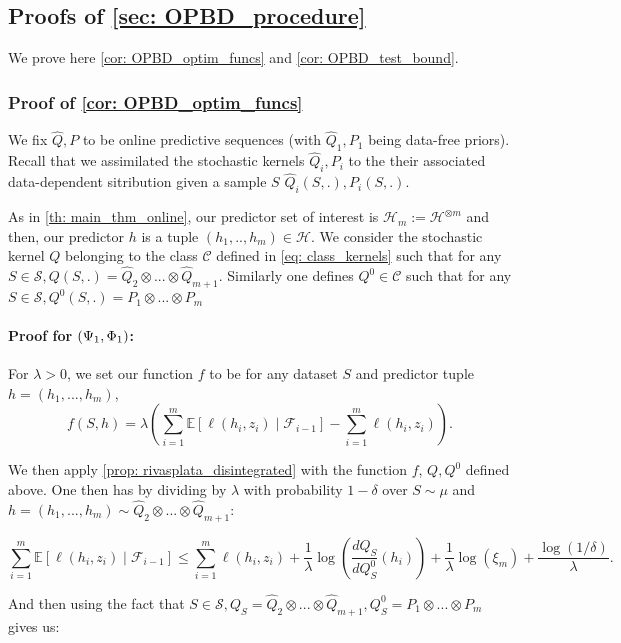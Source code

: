 \subsection{Proofs of \cref{sec: OPBD_procedure}}
\label{sec: proofs_sec4}
We prove here \cref{cor: OPBD_optim_funcs} and \cref{cor: OPBD_test_bound}.

\subsubsection{Proof of \cref{cor: OPBD_optim_funcs}}
We fix $\hat{Q},P$ to be online predictive sequences (with $\hat{Q}_1,P_1$ being data-free priors). Recall that we assimilated the stochastic kernels $\hat{Q}_i,P_i$ to the their associated data-dependent sitribution given a sample $S$ $\hat{Q}_i(S,.), P_i(S,.)$.

As in \cref{th: main_thm_online}, our predictor set of interest is $\mathcal{H}_m:= \mathcal{H}^{\otimes m}$ and then, our predictor $h$ is a tuple $(h_1,..,h_m)\in\mathcal{H}$. We consider the stochastic kernel $Q$ belonging to the class $\mathcal{C}$ defined in \cref{eq: class_kernels} such that for any $S\in\mathcal{S}, Q(S,.) = \hat{Q}_2\otimes ... \otimes \hat{Q}_{m+1}$.
Similarly one defines $Q^0\in\mathcal{C}$ such that for any $S\in\mathcal{S}, Q^0(S,.) = P_1\otimes ... \otimes P_{m}$




\paragraph{Proof for $(\Psi_{\normalfont1},\Phi_{\normalfont1})$:}

For $\lambda>0$, we set our function $f$ to be for any dataset $S$ and predictor tuple $h=(h_1,...,h_m)$,
\[f(S,h) = \lambda \left(\sum_{i=1}^m \mathbb{E}\left[\ell(h_i,z_i)\mid \mathcal{F}_{i-1}\right]- \sum_{i=1}^m \ell(h_i,z_i) \right).\]

We then apply \cref{prop: rivasplata_disintegrated} with the function $f$, $Q,Q^0$ defined above. One then has by dividing by $\lambda$ with probability $1-\delta$ over $S\sim \mu$ and $h=(h_1,...,h_m)\sim \hat{Q}_2\otimes ... \otimes \hat{Q}_{m+1}$:

\[ \sum_{i=1}^m  \mathbb{E}[\ell(h_i,z_i) \mid \mathcal{F}_{i-1}]   \leq \sum_{i=1}^m  \ell(h_i,z_i)  + \frac{1}{\lambda}\log\left(\frac{dQ_S}{dQ_S^0}(h_i)\right) + \frac{1}{\lambda} \log(\xi_m) + \frac{\log(1/\delta)}{\lambda}. \]

And then using the fact that $S\in\mathcal{S}, Q_S = \hat{Q}_2\otimes ... \otimes \hat{Q}_{m+1}, Q^0_S = P_1\otimes ... \otimes P_{m}$ gives us:

